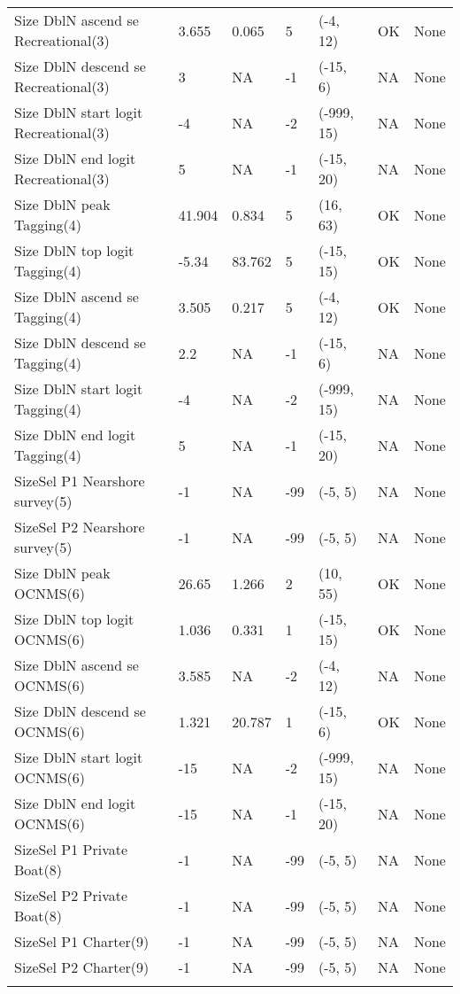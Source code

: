 \documentclass[11pt,
  english,
  letterpaper,
]{article}
\begin{document}
\begin{landscape}
\begin{longtable}[t]{>{\raggedright\arraybackslash}p{7.5cm}lllll>{\raggedright\arraybackslash}p{3.5cm}}
Size DblN ascend se Recreational(3) & 3.655 & 0.065 & 5 & (-4, 12) & OK & None\\
Size DblN descend se Recreational(3) & 3 & NA & -1 & (-15, 6) & NA & None\\
Size DblN start logit Recreational(3) & -4 & NA & -2 & (-999, 15) & NA & None\\
Size DblN end logit Recreational(3) & 5 & NA & -1 & (-15, 20) & NA & None\\
Size DblN peak Tagging(4) & 41.904 & 0.834 & 5 & (16, 63) & OK & None\\
Size DblN top logit Tagging(4) & -5.34 & 83.762 & 5 & (-15, 15) & OK & None\\
Size DblN ascend se Tagging(4) & 3.505 & 0.217 & 5 & (-4, 12) & OK & None\\
Size DblN descend se Tagging(4) & 2.2 & NA & -1 & (-15, 6) & NA & None\\
Size DblN start logit Tagging(4) & -4 & NA & -2 & (-999, 15) & NA & None\\
Size DblN end logit Tagging(4) & 5 & NA & -1 & (-15, 20) & NA & None\\
SizeSel P1 Nearshore survey(5) & -1 & NA & -99 & (-5, 5) & NA & None\\
SizeSel P2 Nearshore survey(5) & -1 & NA & -99 & (-5, 5) & NA & None\\
Size DblN peak OCNMS(6) & 26.65 & 1.266 & 2 & (10, 55) & OK & None\\
Size DblN top logit OCNMS(6) & 1.036 & 0.331 & 1 & (-15, 15) & OK & None\\
Size DblN ascend se OCNMS(6) & 3.585 & NA & -2 & (-4, 12) & NA & None\\
Size DblN descend se OCNMS(6) & 1.321 & 20.787 & 1 & (-15, 6) & OK & None\\
Size DblN start logit OCNMS(6) & -15 & NA & -2 & (-999, 15) & NA & None\\
Size DblN end logit OCNMS(6) & -15 & NA & -1 & (-15, 20) & NA & None\\
SizeSel P1 Private Boat(8) & -1 & NA & -99 & (-5, 5) & NA & None\\
SizeSel P2 Private Boat(8) & -1 & NA & -99 & (-5, 5) & NA & None\\
SizeSel P1 Charter(9) & -1 & NA & -99 & (-5, 5) & NA & None\\
SizeSel P2 Charter(9) & -1 & NA & -99 & (-5, 5) & NA & None\\*
\end{longtable}
\endgroup{}
\end{landscape}
\endgroup{}
\end{document}
